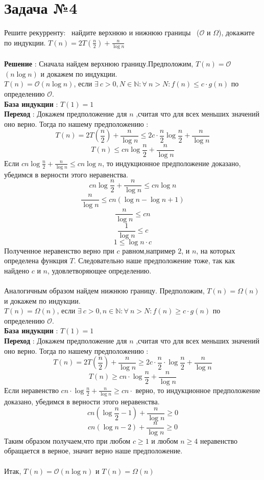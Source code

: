 \documentclass{article}
\begin{document}
\section*{Задача №4}
Решите рекурренту: \ найдите верхнюю и нижнюю границы \ ($\mathcal{O}$ и  $\Omega$), докажите по индукции. 
$T(n) = 2T(\frac{n}{2}) + \frac{n}{\log{n}} $
\\\\
\textbf{Решение} : 
Сначала найдем верхнюю границу.Предположим, $T(n) = \mathcal{O}$$(n\log{n})$ и докажем по индукции.
\\
 $T(n) = \mathcal{O}$$(n\log{n})$, 
 если $\exists \ c > 0, N \in \mathbb{N} : \forall \ n > N : f(n) \leq c \cdot g(n)$ по определению $\mathcal{O}$.
\\
\textbf{База индукции} : $T(1) = 1$
\\
\textbf{Переход} : Докажем предположение для $n$ ,считая что для всех меньших значений оно верно. Тогда по нашему предположению : 
$$T(n) = 2T(\frac{n}{2}) + \frac{n}{\log{n}} \leq 2c \cdot \frac{n}{2}\log{\frac{n}{2}}+ \frac{n}{\log n}$$
$$T(n) \leq cn \log{\frac{n}{2}} + \frac{n}{\log n}$$
Если $cn \log{\frac{n}{2}} + \frac{n}{\log n} \leq cn \log{n}$, то индукционное предположение доказано, убедимся в верности этого неравенства.
$$cn \log{\frac{n}{2}} + \frac{n}{\log n}\leq cn \log{n}$$
$$\frac{n}{\log n}\leq cn(\log n - \log n + 1) $$
$$\frac{n}{\log n} \leq cn$$
$$\frac{1}{\log n} \leq c$$
$$ 1 \leq \log n \cdot c$$
Полученное неравенство верно при $c$ равном,например $2$, и $n$, на которых определена функция $T$. Следовательно наше предположение тоже, так как найдено $c$ и $n$, удовлетворяющее определению.
\\\\



Аналогичным образом найдем нижнюю границу.
Предположим, $T(n) = \Omega$$(n)$ и докажем по индукции.
\\
$T(n) = \Omega(n)$, 
если $\exists \ c > 0, n \in \mathbb{N} : \forall \ n > N : f(n) \geq c \cdot g(n)$ по определению $\mathcal{O}$.
\\
\textbf{База индукции} : $T(1) = 1$
\\
\textbf{Переход} : Докажем предположение для $n$ ,считая что для всех меньших значений оно верно. Тогда по нашему предположению : 
$$T(n) = 2T(\frac{n}{2}) + \frac{n}{\log{n}} \geq 2c \cdot \frac{n}{2} \cdot \log{\frac{n}{2}} + \frac{n}{\log{n}}$$
$$T(n) \geq cn\cdot \log{\frac{n}{2}} + \frac{n}{\log{n}}$$
Если неравенство $cn \cdot  \log{\frac{n}{2}} + \frac{n}{\log{n}} \geq cn \cdot $ верно, то индукционное предположение доказано, убедимся в верности этого неравенства.
$$cn(\log{\frac{n}{2}} - 1) + \frac{n}{\log{n}} \geq 0$$
$$cn(\log{n} - 2) + \frac{n}{\log{n}} \geq 0$$ 
Таким образом получаем,что при любом $c \geq 1$ и любом $n \geq 4$ неравенство обращается в верное, значит верно наше предположение.
\\\\
Итак, $T(n) = \mathcal{O}(n\log{n})$ и $T(n) = \Omega(n)$ 
\end{document}

